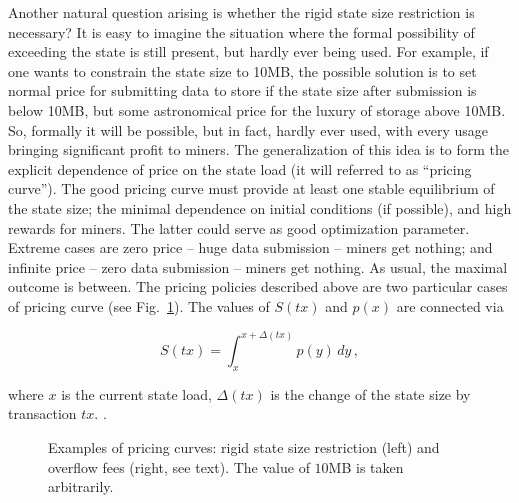 \documentclass[]{llncs}   %
\newcommand{\authnote}[2]{\marginpar{\parbox{\marginparwidth}{\tiny %
  \textsf{#1 {\textcolor{blue}{notes: #2}}}}}%
  \textcolor{blue}{\textbf{\dag}}}
\newcommand{\authnote}[2]{
  \textsf{#1\textcolor{blue}{ #2}}}
\newcommand{\authnote}[2]{}
\newcommand{\knote}[1]{{\authnote{\textcolor{green}{Alex notes:}}{#1}}}
\newcommand{\vk}[1]{{\authnote{\textcolor{red}{V:}}{#1}}}
\begin{document}
Another natural question arising is whether the rigid state size restriction is
necessary?  It is easy to imagine the situation where the formal possibility of
exceeding the state is still present, but hardly ever being used. For example,
if one wants to constrain the state size to 10MB, the possible solution is to
set normal price for submitting data to store if the state size after submission
is below 10MB, but some astronomical price for the luxury of storage above 10MB.
So, formally it will be possible, but in fact, hardly ever used, with every
usage bringing significant profit to miners. The generalization of this idea is
to form the explicit dependence of price on the state load (it will referred to
as ``pricing curve''). The good pricing curve must provide at least one stable
equilibrium of the state size; the minimal dependence on initial conditions (if
possible), and high rewards for miners. The latter could serve as good
optimization parameter. Extreme cases are zero price -- huge data submission --
miners get nothing; and infinite price -- zero data submission -- miners get
nothing. As usual, the maximal outcome is between.  The pricing policies
described above are two particular cases of pricing curve (see
Fig.~\ref{fig:steps}). The values of $S(tx)$ and $p(x)$ are connected via

\knote{definitions of $y$ and $p()$ are missed}
\begin{equation}
    S(tx)=\int_x^{x+\Delta(tx)}p(y)\,dy\,,
    \label{eq:Sp}
\end{equation}

where $x$ is the current state load, $\Delta(tx)$ is the change of the state
size by transaction $tx$. \vk{How to order transactions in the block? Is it Ok
to use the difference? What if it is negative?}.
\begin{figure} 
    \hfill 
    \hfill 
    \hfill 
    \caption{ 
        Examples of pricing curves: rigid state size restriction (left) and 
        overflow fees (right, see text). The value of $10$MB is taken 
        arbitrarily. 
        \label{fig:steps} 
    } 
\end{figure} 
\end{document}
